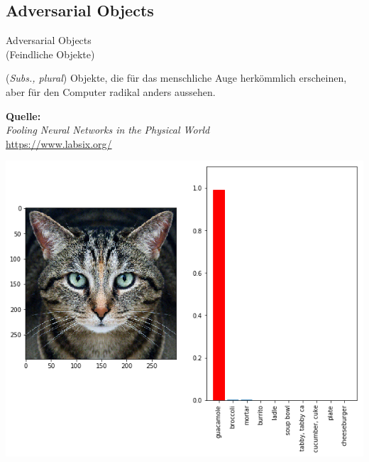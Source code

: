 \documentclass[aspectratio=169,x11names]{beamer}
\begin{document}

\subsection{Adversarial Objects}
\begin{frame}
\begin{center}
\huge
\glqq Adversarial Objects\grqq \\
\Large
(Feindliche Objekte)
\end{center}
\bigskip
\normalsize

(\textit{Subs., plural}) Objekte, die für das menschliche Auge herkömmlich erscheinen, aber für den Computer radikal anders aussehen.
\bigskip

\begin{center}
\textbf{Quelle:}\\
\emph{Fooling Neural Networks in the Physical World}\\
\url{https://www.labsix.org/}
\end{center}
\end{frame}

\begin{frame}
\begin{center}
\includegraphics[height=0.95\textheight,keepaspectratio]{images/cat_adversarial.png} 
\end{center}
\end{frame}
\end{document}
